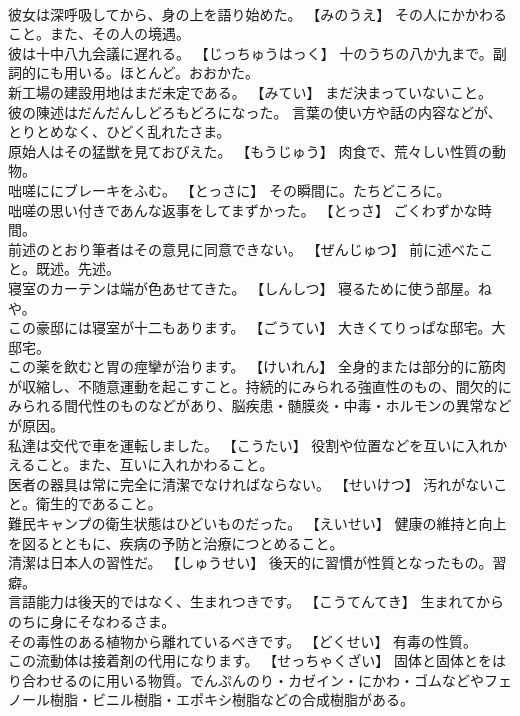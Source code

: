 \documentclass[8pt]{extreport}
\begin{document}
\begin{CJK}{UTF8}{min}
\\	彼女は深呼吸してから、身の上を語り始めた。	【みのうえ】 その人にかかわること。また、その人の境遇。
\\	彼は十中八九会議に遅れる。	【じっちゅうはっく】 十のうちの八か九まで。副詞的にも用いる。ほとんど。おおかた。
\\	新工場の建設用地はまだ未定である。	【みてい】 まだ決まっていないこと。
\\	彼の陳述はだんだんしどろもどろになった。	言葉の使い方や話の内容などが、とりとめなく、ひどく乱れたさま。
\\	原始人はその猛獣を見ておびえた。	【もうじゅう】 肉食で、荒々しい性質の動物。
\\	咄嗟ににブレーキをふむ。	【とっさに】 その瞬間に。たちどころに。
\\	咄嗟の思い付きであんな返事をしてまずかった。	【とっさ】 ごくわずかな時間。
\\	前述のとおり筆者はその意見に同意できない。	【ぜんじゅつ】 前に述べたこと。既述。先述。
\\	寝室のカーテンは端が色あせてきた。	【しんしつ】 寝るために使う部屋。ねや。
\\	この豪邸には寝室が十二もあります。	【ごうてい】 大きくてりっぱな邸宅。大邸宅。
\\	この薬を飲むと胃の痙攣が治ります。	【けいれん】 全身的または部分的に筋肉が収縮し、不随意運動を起こすこと。持続的にみられる強直性のもの、間欠的にみられる間代性のものなどがあり、脳疾患・髄膜炎・中毒・ホルモンの異常などが原因。
\\	私達は交代で車を運転しました。	【こうたい】 役割や位置などを互いに入れかえること。また、互いに入れかわること。
\\	医者の器具は常に完全に清潔でなければならない。	【せいけつ】 汚れがないこと。衛生的であること。
\\	難民キャンプの衛生状態はひどいものだった。	【えいせい】 健康の維持と向上を図るとともに、疾病の予防と治療につとめること。
\\	清潔は日本人の習性だ。	【しゅうせい】 後天的に習慣が性質となったもの。習癖。
\\	言語能力は後天的ではなく、生まれつきです。	【こうてんてき】 生まれてからのちに身にそなわるさま。
\\	その毒性のある植物から離れているべきです。	【どくせい】 有毒の性質。
\\	この流動体は接着剤の代用になります。	【せっちゃくざい】 固体と固体とをはり合わせるのに用いる物質。でんぷんのり・カゼイン・にかわ・ゴムなどやフェノール樹脂・ビニル樹脂・エポキシ樹脂などの合成樹脂がある。

\end{CJK}
\end{document}

